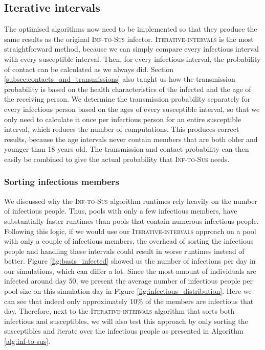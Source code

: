 \subsection{Iterative intervals}
\label{subsec:iterative_intervals_inf-to-sus}
The optimised algorithms now need to be implemented so that they produce the same results as the original \textsc{Inf-to-Sus} infector. \textsc{Iterative-intervals} is the most straightforward method, because we can simply compare every infectious interval with every susceptible interval. Then, for every infectious interval, the probability of contact can be calculated as we always did. Section \ref{subsec:contacts_and_transmissions} also taught us how the transmission probability is based on the health characteristics of the infected and the age of the receiving person. We determine the transmission probability separately for every infectious person based on the ages of every susceptible interval, so that we only need to calculate it once per infectious person for an entire susceptible interval, which reduces the number of computations. This produces correct results, because the age intervals never contain members that are both older and younger than 18 years old. The transmission and contact probability can then easily be combined to give the actual probability that \textsc{Inf-to-Sus} needs.

\subsubsection{Sorting infectious members}
We discussed why the \textsc{Inf-to-Sus} algorithm runtimes rely heavily on the number of infectious people. Thus, pools with only a few infectious members, have substantially faster runtimes than pools that contain numerous infectious people. Following this logic, if we would use our \textsc{Iterative-intervals} approach on a pool with only a couple of infectious members, the overhead of sorting the infectious people and handling these intervals could result in worse runtimes instead of better. Figure \ref{fig:basis_infected} showed us the number of infections per day in our simulations, which can differ a lot. Since the most amount of individuals are infected around day 50, we present the average number of infectious people per pool size on this simulation day in Figure \ref{fig:infectious_distribution}. Here we can see that indeed only approximately 10\% of the members are infectious that day. Therefore, next to the \textsc{Iterative-intervals} algorithm that sorts both infectious and susceptibles, we will also test this approach by only sorting the susceptibles and iterate over the infectious people as presented in Algorithm \ref{alg:inf-to-sus}.

